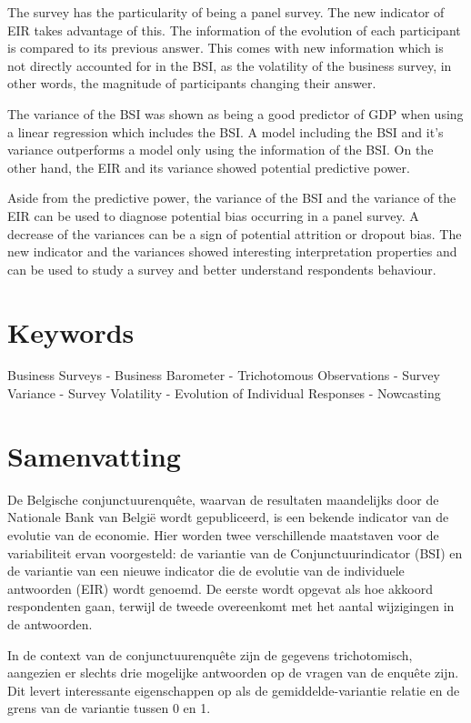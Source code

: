 \documentclass[12pt,a4paper,oneside]{book}
\begin{document}
The survey has the particularity of being a panel survey. The new indicator of EIR takes advantage of this. The information of the evolution of each participant is compared to its previous answer.
This comes with new information which is not directly accounted for in the BSI, as the volatility of the business survey, in other words, the magnitude of participants changing their answer.

The variance of the BSI was shown as being a good predictor of GDP when using a linear regression which includes the BSI. A model including the BSI and it's variance outperforms a model only using the information of the BSI.
On the other hand, the EIR and its variance showed potential predictive power.

Aside from the predictive power, the variance of the BSI and the variance of the EIR can be used to diagnose potential bias occurring in a panel survey. A decrease of the variances can be a sign of potential attrition or dropout bias. The new indicator and the variances showed interesting interpretation properties and can be used to study a survey and better understand respondents behaviour.

\section*{Keywords}
Business Surveys - 
Business Barometer -
Trichotomous Observations -
Survey Variance - 
Survey Volatility -
Evolution of Individual Responses -
Nowcasting

\section*{Samenvatting}

De Belgische conjunctuurenquête, waarvan de resultaten maandelijks door de Nationale Bank van België wordt gepubliceerd, is een bekende indicator van de evolutie van de economie.
Hier worden twee verschillende maatstaven voor de variabiliteit ervan voorgesteld: de variantie van de Conjunctuurindicator (BSI) en de variantie van een nieuwe indicator die de evolutie van de individuele antwoorden (EIR) wordt genoemd.
De eerste wordt opgevat als hoe akkoord respondenten gaan, terwijl de tweede overeenkomt met het aantal wijzigingen in de antwoorden.

In de context van de conjunctuurenquête zijn de gegevens trichotomisch, aangezien er slechts drie mogelijke antwoorden op de vragen van de enquête zijn. 
Dit levert interessante eigenschappen op als de gemiddelde-variantie relatie en de grens van de variantie tussen 0 en 1.
\end{document}
